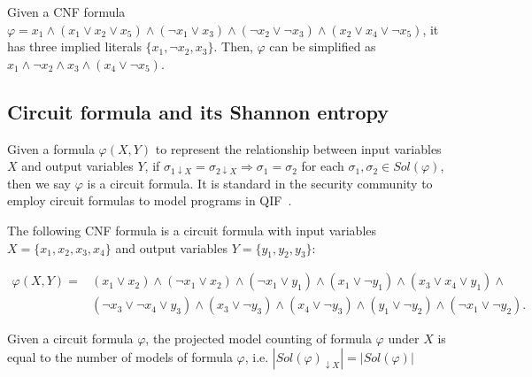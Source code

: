 \begin{example}\label{testenv-example}
Given a CNF formula $\varphi = x_1  \wedge (x_1 \vee x_2 \vee x_5) \wedge (\neg x_1 \vee x_3) \wedge (\neg x_2 \vee \neg x_3) \wedge (x_2 \vee x_4 \vee \neg x_5)$, it has three implied literals $\{x_1, \neg x_2, x_3\}$.
Then, $\varphi$ can be simplified as $x_1 \land \neg x_2 \land x_3 \land (x_4 \vee \neg x_5)$.
\end{example}



\subsection{Circuit formula and its Shannon entropy}
Given a formula $\varphi(X, Y)$ to represent the relationship between input variables $X$ and output variables $Y$, if $\sigma_{1 \downarrow X} = \sigma_{2 \downarrow X} \Longrightarrow \sigma_1 = \sigma_2$ for each $\sigma_1,\sigma_2 \in \mathit{Sol}(\varphi)$, then we say $\varphi$ is a circuit formula.
It is standard in the security community to employ circuit formulas to model programs in QIF~\cite{golia2022scalable}.

\begin{example}\label{circuit-example}
	The following CNF formula is a circuit formula with input variables $X = \{x_1,x_2,x_3,x_4 \}$ and output variables $Y = \{ y_1,y_2,y_3 \}$:
	
	\begin{equation*}
		\begin{split}
			\varphi(X, Y) = & (x_1 \vee x_2) \wedge (\neg x_1 \vee x_2) \wedge (\neg x_1 \vee y_1) \wedge (x_1 \vee \neg y_1) \wedge  (x_3 \vee x_4 \vee y_1) \wedge \\ 
			&  (\neg x_3 \vee \neg x_4 \vee y_3) \wedge (x_3 \vee \neg y_3) \wedge (x_4 \vee \neg y_3) \wedge (y_1 \vee \neg y_2) \wedge (\neg x_1 \vee \neg y_2) .
		\end{split} 
	\end{equation*}
\end{example}


\begin{proposition}\label{projected-proposition}
Given a circuit formula $\varphi$, the projected model counting of formula $\varphi$ under $X$ is equal to the number of models of formula $\varphi$, i.e. $ \left| \mathit{Sol}(\varphi)_{\downarrow X} \right| = \left| \mathit{Sol}(\varphi)  \right|$	
\end{proposition}

